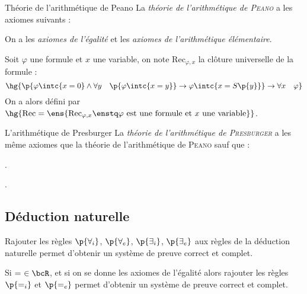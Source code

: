     \begin{example}{Théorie de l'arithmétique de Peano}{}
        La \textit{théorie de l'arithmétique de \textsc{Peano}} a les axiomes suivants :
        \begin{enumerate}
            \itt On a les \textit{axiomes de l'égalité} et les \textit{axiomes de l'arithmétique élémentaire}.
            
            \itt Soit $\varphi$ une formule et $x$ une variable, on note $\mathrm{Rec}_{\varphi, x}$ la clôture universelle de la formule :
            \[ \hg{\p{\varphi\intc{x = 0} \land \forall y \quad \p{\varphi\intc{x = y}} \rightarrow \varphi\intc{x = S\p{y}}} \rightarrow \forall x\quad \varphi}\]
            On a alors  défini par $\hg{\mathrm{Rec} = \ens{\mathrm{Rec}_{\varphi, x} \enstq \varphi \ \text{est une formule et} \ x \ \text{une variable}}}$.
        \end{enumerate}
        
    \end{example}

    \begin{example}{L'arithmétique de Presburger}{}
        La \textit{théorie de l'arithmétique de \textsc{Presburger}} a les même axiomes que la théorie de l'arithmétique de \textsc{Peano} sauf que :
        \begin{enumerate}
            \itt {}.
            
            \itt {}.
        \end{enumerate}
    \end{example}

    \subsection{Déduction naturelle}
    
    \begin{theorem}{}{}
        Rajouter les règles $\p{\forall_i}$, $\p{\forall_e}$, $\p{\exists_i}$, $\p{\exists_e}$ aux règles de la déduction naturelle permet d'obtenir un système de preuve correct et complet. 
    \end{theorem}
    
    \begin{theorem}{}{}
        Si $= \ \in \bcR$, et si on se donne les axiomes de l'égalité alors rajouter les règles $\p{=_i}$ et $\p{=_e}$ permet d'obtenir un système de preuve correct et complet.
    \end{theorem}
    
